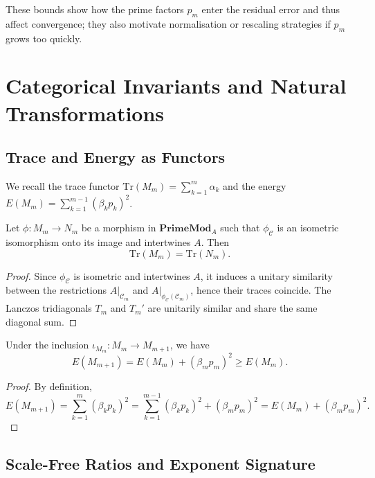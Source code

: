\documentclass[11pt]{article}
\begin{document}
These bounds show how the prime factors $p_m$ enter the residual error
and thus affect convergence; they also motivate normalisation or
rescaling strategies if $p_m$ grows too quickly.

\section{Categorical Invariants and Natural Transformations}

\subsection{Trace and Energy as Functors}

We recall the trace functor
$\mathrm{Tr}(M_m)=\sum_{k=1}^m\alpha_k$ and the energy
$E(M_m)=\sum_{k=1}^{m-1}(\beta_k p_k)^2$.\cite{PrimeEigenSolvers}

\begin{proposition}
Let $\phi : M_m\to N_m$ be a morphism in $\mathbf{PrimeMod}_A$ such
that $\phi_{\mathcal{C}}$ is an isometric isomorphism onto its image
and intertwines $A$. Then
\[
\mathrm{Tr}(M_m) = \mathrm{Tr}(N_m).
\]
\end{proposition}

\begin{proof}
Since $\phi_{\mathcal{C}}$ is isometric and intertwines $A$, it induces
a unitary similarity between the restrictions $A|_{\mathcal{C}_m}$ and
$A|_{\phi_{\mathcal{C}}(\mathcal{C}_m)}$, hence their traces
coincide. The Lanczos tridiagonals $T_m$ and $T_m'$ are unitarily
similar and share the same diagonal sum.\cite{LanczosAlgo}
\end{proof}

\begin{proposition}
Under the inclusion $\iota_{M_m} : M_m\to M_{m+1}$, we have
\[
E(M_{m+1}) = E(M_m) + (\beta_m p_m)^2 \ge E(M_m).
\]
\end{proposition}

\begin{proof}
By definition,
\[
E(M_{m+1}) = \sum_{k=1}^{m}(\beta_k p_k)^2 =
\sum_{k=1}^{m-1}(\beta_k p_k)^2 +(\beta_m p_m)^2 = E(M_m)+(\beta_m p_m)^2.
\]
\end{proof}

\subsection{Scale-Free Ratios and Exponent Signature}
\end{document}

